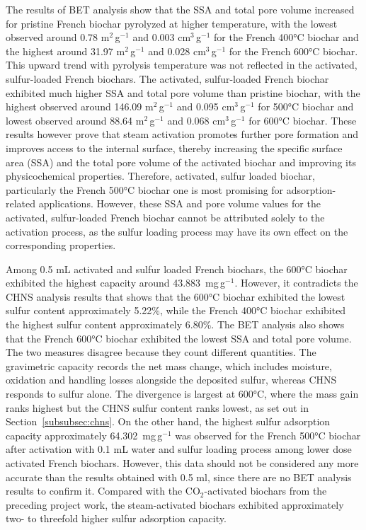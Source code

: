 \vspace{0.3em}

The results of BET analysis show that the SSA and total pore volume increased for pristine French biochar pyrolyzed at higher temperature, with the lowest observed around 0.78 m$^2$\,g$^{-1}$ and 0.003 cm$^3$\,g$^{-1}$ for the French 400°C biochar and the highest around 31.97 m$^2$\,g$^{-1}$ and 0.028 cm$^3$\,g$^{-1}$ for the French 600°C biochar. This upward trend with pyrolysis temperature was not reflected in the activated, sulfur-loaded French biochars. The activated, sulfur-loaded French biochar exhibited much higher SSA and total pore volume than pristine biochar, with the highest observed around 146.09 m$^2$\,g$^{-1}$ and 0.095 cm$^3$\,g$^{-1}$ for 500°C biochar and lowest observed around 88.64 m$^2$\,g$^{-1}$ and 0.068 cm$^3$\,g$^{-1}$ for 600°C biochar. These results however prove that steam activation promotes further pore formation and improves access to the internal surface, thereby increasing the specific surface area (SSA) and the total pore volume of the activated biochar and improving its physicochemical properties. Therefore, activated, sulfur loaded biochar, particularly the French 500°C biochar one is most promising for adsorption-related applications. However, these SSA and pore volume values for the activated, sulfur-loaded French biochar cannot be attributed solely to the activation process, as the sulfur loading process may have its own effect on the corresponding properties. 

\vspace{0.3em}

Among 0.5 mL activated and sulfur loaded French biochars, the 600°C biochar exhibited the highest capacity around 43.883~mg\,g$^{-1}$. However, it contradicts the CHNS analysis results that shows that the 600°C biochar exhibited the lowest sulfur content approximately 5.22\%, while the French 400°C biochar exhibited the highest sulfur content approximately 6.80\%. The BET analysis also shows that the French 600°C biochar exhibited the lowest SSA and total pore volume. The two measures disagree because they count different quantities. The gravimetric capacity records the net mass change, which includes moisture, oxidation and handling losses alongside the deposited sulfur, whereas CHNS responds to sulfur alone. The divergence is largest at 600°C, where the mass gain ranks highest but the CHNS sulfur content ranks lowest, as set out in Section~\ref{subsubsec:chns}. On the other hand, the highest sulfur adsorption capacity approximately 64.302~mg\,g$^{-1}$ was observed for the French 500°C biochar after activation with 0.1 mL water and sulfur loading process among lower dose activated French biochars. However, this data should not be considered any more accurate than the results obtained with 0.5 ml, since there are no BET analysis results to confirm it. Compared with the CO$_2$-activated biochars from the preceding project work, the steam-activated biochars exhibited approximately two- to threefold higher sulfur adsorption capacity. 

